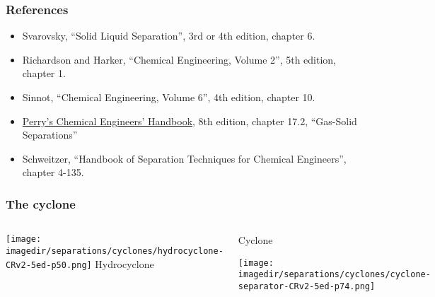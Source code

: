 
\begin{frame}\frametitle{References}
	\begin{itemize}
		\item	Svarovsky, ``Solid Liquid Separation'', 3rd or 4th edition, chapter 6.%
		\item	Richardson and Harker, ``Chemical Engineering, Volume 2'', 5th edition, chapter 1.
		\item	Sinnot, ``Chemical Engineering, Volume 6'', 4th edition, chapter 10.
		\item	\href{http://accessengineeringlibrary.com/browse/perrys-chemical-engineers-handbook-eighth-edition}{Perry's Chemical Engineers' Handbook}, 8th edition, chapter 17.2, ``Gas-Solid Separations''
		\item	Schweitzer, ``Handbook of Separation Techniques for Chemical Engineers'', chapter 4-135.
	\end{itemize}
\end{frame}

\begin{frame}\frametitle{The cyclone}
	\vspace{-24pt}
	\begin{columns}[b]
			\begin{center}
				\texttt{[image: \\imagedir/separations/cyclones/hydrocyclone-CRv2-5ed-p50.png]}
				Hydrocyclone
			\end{center}
			\begin{center}
				Cyclone
				\vspace{12pt}

				\texttt{[image: \\imagedir/separations/cyclones/cyclone-separator-CRv2-5ed-p74.png]}
			\end{center}
	\end{columns}
\end{frame}

